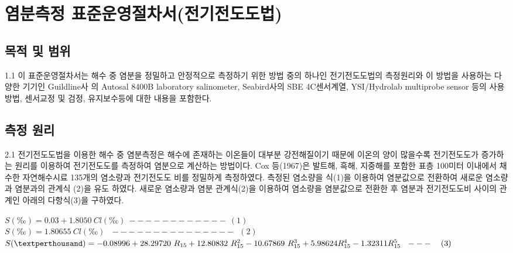 \documentclass[
]{book}
\begin{document}
\hypertarget{uxc5fcuxbd84uxce21uxc815-uxd45cuxc900uxc6b4uxc601uxc808uxcc28uxc11cuxc804uxae30uxc804uxb3c4uxb3c4uxbc95}{%
\chapter{염분측정 표준운영절차서(전기전도도법)}\label{uxc5fcuxbd84uxce21uxc815-uxd45cuxc900uxc6b4uxc601uxc808uxcc28uxc11cuxc804uxae30uxc804uxb3c4uxb3c4uxbc95}}

\hypertarget{uxbaa9uxc801-uxbc0f-uxbc94uxc704-1}{%
\section{목적 및 범위}\label{uxbaa9uxc801-uxbc0f-uxbc94uxc704-1}}

1.1 이 표준운영절차서는 해수 중 염분을 정밀하고 안정적으로 측정하기 위한 방법 중의 하나인 전기전도도법의 측정원리와 이 방법을 사용하는 다양한 기기인 Guildline사 의 Autosal 8400B laboratory salinometer, Seabird사의 SBE 4C센서계열, YSI/Hydrolab multiprobe sensor 등의 사용방법, 센서교정 및 검정, 유지보수등에 대한 내용을 포함한다.

\hypertarget{uxce21uxc815-uxc6d0uxb9ac-1}{%
\section{측정 원리}\label{uxce21uxc815-uxc6d0uxb9ac-1}}

2.1 전기전도도법을 이용한 해수 중 염분측정은 해수에 존재하는 이온들이 대부분 강전해질이기 때문에 이온의 양이 많을수록 전기전도도가 증가하는 원리를 이용하여 전기전도도를 측정하여 염분으로 계산하는 방법이다. Cox 등(1967)은 발트해, 흑해, 지중해를 포함한 표층 100미터 이내에서 채수한 자연해수시료 135개의 염소량과 전기전도도 비를 정밀하게 측정하였다. 측정된 염소량을 식(1)을 이용하여 염분값으로 전환하여 새로운 염소량과 염분과의 관계식 (2)을 유도 하였다. 새로운 염소량과 염분 관계식(2)을 이용하여 염소량을 염분값으로 전환한 후 염분과 전기전도도비 사이의 관계인 아래의 다항식(3)을 구하였다.

\(S(‰)=0.03 + 1.8050 ~ Cl(‰) ~------------~~ (1)\)\\
\(S(‰)=1.80655 ~ Cl(‰) ~~~ ---------------~~ (2)\)\\
\(S(‰)= -0.08996 + 28.29720 ~ R_{15} + 12.80832~ R_{15}^2 \\ -10.67869 ~ R_{15}^3 + 5.98624 R_{15}^4 - 1.32311 R_{15}^5 ~~--- ~~~(3)\)
\end{document}
